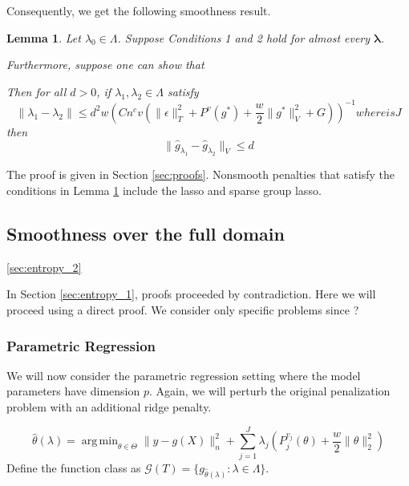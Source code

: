 \documentclass[12pt]{article}
\newtheorem{lemma}{Lemma}
\DeclareMathOperator*{\argmin}{arg\,min}
\begin{document}
Consequently, we get the following smoothness result.
\begin{lemma}
\label{lemma:nonsmooth}
Let $\lambda_0 \in \Lambda$. 
Suppose Conditions 1 and 2 hold for almost every $\boldsymbol{\lambda}$.

Furthermore, suppose one can show that 
\begin{equation}
\end{equation}

Then for all $d > 0$, if $\lambda_1, \lambda_2 \in \Lambda$ satisfy
\begin{equation}
\label{lambda_close_condition}
\| \lambda_1 -  \lambda_2 \| \le  d^2 w \left ( Cn^{c}v\left(\|\epsilon\|_{T}^{2}+P^{v}(g^{*})+\frac{w}{2}\|g^{*}\|_V^{2}+G\right) \right )^{-1} whereisJ
\end{equation}
then
\begin{equation}
\| \hat{g}_{\lambda_1} -  \hat{g}_{\lambda_2} \|_V \le d
\end{equation}
\end{lemma}



The proof is given in Section \ref{sec:proofs}. Nonsmooth penalties that satisfy the conditions in Lemma \ref{lemma:nonsmooth} include the lasso and sparse group lasso.

\subsection{Smoothness over the full domain}
\ref{sec:entropy_2}

In Section \ref{sec:entropy_1}, proofs proceeded by contradiction. Here we will proceed using a direct proof. We consider only specific problems since ? 

\subsubsection{Parametric Regression}
We will now consider the parametric regression setting where the model parameters have dimension $p$. Again, we will perturb the original penalization problem with an additional ridge penalty.

\begin{equation}
\hat{\theta}(\lambda) = \argmin_{\theta \in \Theta} \| y -  g(X) \|^2_n + \sum_{j=1}^J \lambda_j \left ( P^{v_j}_j(\theta) + \frac{w}{2} \| \theta \|^2_2 \right )
\end{equation}
Define the function class as $\mathcal{G}(T) = \{ g_{\hat{\theta}(\lambda)} : \lambda \in \Lambda \}$.
\end{document}

